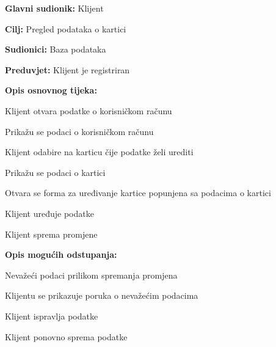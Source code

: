 \noindent {}
\begin{packed_item}
	
	\item \textbf{Glavni sudionik:} Klijent
	\item  \textbf{Cilj:} Pregled podataka o kartici
	\item  \textbf{Sudionici:} Baza podataka
	\item  \textbf{Preduvjet:} Klijent je registriran
	\item  \textbf{Opis osnovnog tijeka:}
	
	\item[] \begin{packed_enum}
		
		\item Klijent otvara podatke o korisničkom računu
		\item Prikažu se podaci o korisničkom računu
		\item Klijent odabire na karticu čije podatke želi urediti
		\item Prikažu se podaci o kartici
		\item Otvara se forma za uređivanje kartice popunjena sa podacima o kartici
		\item Klijent uređuje podatke
		\item Klijent sprema promjene
		
			\item  \textbf{Opis mogućih odstupanja:}
	
	\item[] \begin{packed_item}
		
		\item[6.a] Nevažeći podaci prilikom spremanja promjena
		\item[] \begin{packed_enum}
			
			\item Klijentu se prikazuje poruka o nevažećim podacima
			\item Klijent ispravlja podatke
			\item Klijent ponovno sprema podatke
			
		\end{packed_enum}
		
	\end{packed_item}
		
	\end{packed_enum}
\end{packed_item}


